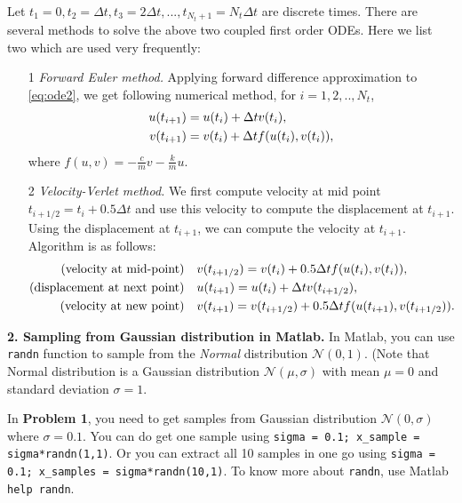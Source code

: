 \documentclass[11pt,a4paper]{article}
\begin{document}
 Let $t_1 = 0, t_2 = \Delta t, t_3 = 2 \Delta t, ..., t_{N_t + 1} = N_t \Delta t$ are discrete times. There are several methods to solve the above two coupled first order ODEs. Here we list two which are used very frequently:
\begin{itemize}
\item[1] \textit{Forward Euler method.} Applying forward difference approximation to \eqref{eq:ode2}, we get following numerical method, for $i=1, 2, .., N_t$,
\begin{align}
u(t_{i+1}) &= u(t_i) + \Delta t v(t_i), \notag \\
v(t_{i+1}) &= v(t_i) + \Delta t f(u(t_i), v(t_i))  ,
\end{align}
where $f(u, v) = -\frac{c}{m} v - \frac{k}{m} u$. 

\item[2] \textit{Velocity-Verlet method.} We first compute velocity at mid point $t_{i+1/2} = t_i + 0.5\Delta t$ and use this velocity to compute the displacement at $t_{i+1}$. Using the displacement at $t_{i+1}$, we can compute the velocity at $t_{i+1}$. Algorithm is as follows:
\begin{align}
\text{(velocity at mid-point)} & \quad v(t_{i+1/2}) = v(t_i) + 0.5\Delta t f(u(t_i), v(t_i)), \notag \\
\text{(displacement at next point)} & \quad u(t_{i+1}) = u(t_i) + \Delta t v(t_{i+1/2}), \notag \\
\text{(velocity at new point)} & \quad v(t_{i+1}) = v(t_{i+1/2}) + 0.5\Delta t f(u(t_{i+1}), v(t_{i+1/2})) .
\end{align}

\end{itemize}

\vspace{10pt}
\noindent\textbf{2. Sampling from Gaussian distribution in Matlab.} In Matlab, you can use \texttt{randn} function to sample from the {\it Normal} distribution $\mathcal{N}(0, 1)$. (Note that Normal distribution is a Gaussian distribution $\mathcal{N}(\mu, \sigma)$ with mean $\mu = 0$ and standard deviation $\sigma = 1$. 

In \textbf{Problem 1}, you need to get samples from Gaussian distribution $\mathcal{N}(0, \sigma)$ where $\sigma = 0.1$. You can do get one sample using \texttt{sigma = 0.1; x\_sample = sigma*randn(1,1)}. Or you can extract all 10 samples in one go using \texttt{sigma = 0.1; x\_samples = sigma*randn(10,1)}. To know more about \texttt{randn}, use Matlab \texttt{help randn}.
\end{document}
